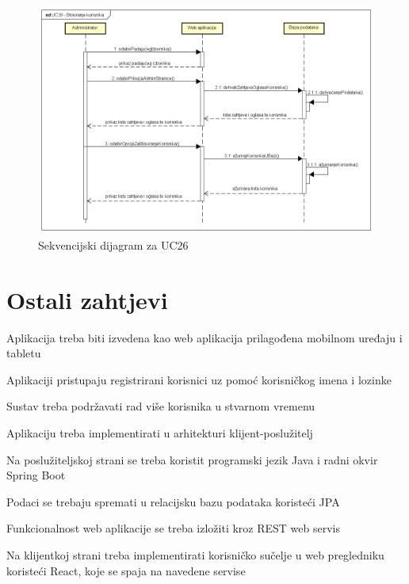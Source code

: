 				\begin{figure}[htb]
					\centering
					\includegraphics[width=14cm]{slike/Sekvencijski dijagram - UC26}
					\caption{Sekvencijski dijagram za UC26}
					\label{fig:Sekvencijski-UC26}
				\end{figure}
				\eject	
	
		\section{Ostali zahtjevi}
		
			\begin{packed_item}
				
				\item Aplikacija treba biti izvedena kao web aplikacija prilagođena mobilnom uređaju i tabletu
				\item Aplikaciji pristupaju registrirani korisnici uz pomoć korisničkog imena i lozinke
				\item Sustav treba podržavati rad više korisnika u stvarnom vremenu
				\item Aplikaciju treba implementirati u arhitekturi klijent-poslužitelj
				\item Na poslužiteljskoj strani se treba koristit programski jezik Java i radni okvir Spring Boot
				\item Podaci se trebaju spremati u relacijsku bazu podataka koristeći JPA
				\item Funkcionalnost web aplikacije se treba izložiti kroz REST web servis
				\item Na klijentkoj strani treba implementirati korisničko sučelje u web pregledniku koristeći React, koje se spaja na navedene servise
			\end{packed_item}
			 
			 
			 
	